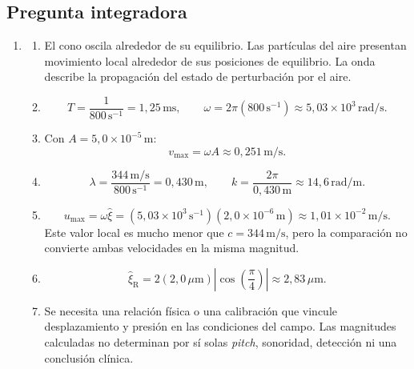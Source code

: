 \subsection*{Pregunta integradora}

\begin{enumerate}[label=\textbf{I\arabic*.},leftmargin=*]
    \item
    \begin{enumerate}[label=\alph*)]
        \item El cono oscila alrededor de su equilibrio. Las partículas del
        aire presentan movimiento local alrededor de sus posiciones de
        equilibrio. La onda describe la propagación del estado de
        perturbación por el aire.
        \item
        \[
            T=\frac{1}{800\,\text{s}^{-1}}
              =1{,}25\,\text{ms},
            \qquad
            \omega=2\pi(800\,\text{s}^{-1})
              \approx5{,}03\times10^{3}\,\text{rad}/\text{s}.
        \]
        \item Con \(A=5{,}0\times10^{-5}\,\text{m}\):
        \[
            v_{\max}=\omega A
              \approx0{,}251\,\text{m}/\text{s}.
        \]
        \item
        \[
            \lambda=\frac{344\,\text{m}/\text{s}}
                           {800\,\text{s}^{-1}}
                    =0{,}430\,\text{m},
            \qquad
            k=\frac{2\pi}{0{,}430\,\text{m}}
              \approx14{,}6\,\text{rad}/\text{m}.
        \]
        \item
        \[
            u_{\max}
              =\omega\hat{\xi}
              =(5{,}03\times10^{3}\,\text{s}^{-1})
               (2{,}0\times10^{-6}\,\text{m})
              \approx1{,}01\times10^{-2}\,\text{m}/\text{s}.
        \]
        Este valor local es mucho menor que
        \(c=344\,\text{m}/\text{s}\), pero la comparación no convierte ambas
        velocidades en la misma magnitud.
        \item
        \[
            \hat{\xi}_\mathrm{R}
              =2(2{,}0\,\mu\text{m})
               \left|\cos\left(\frac{\pi}{4}\right)\right|
              \approx2{,}83\,\mu\text{m}.
        \]
        \item Se necesita una relación física o una calibración que vincule
        desplazamiento y presión en las condiciones del campo. Las magnitudes
        calculadas no determinan por sí solas \emph{pitch}, sonoridad,
        detección ni una conclusión clínica.
    \end{enumerate}
\end{enumerate}

